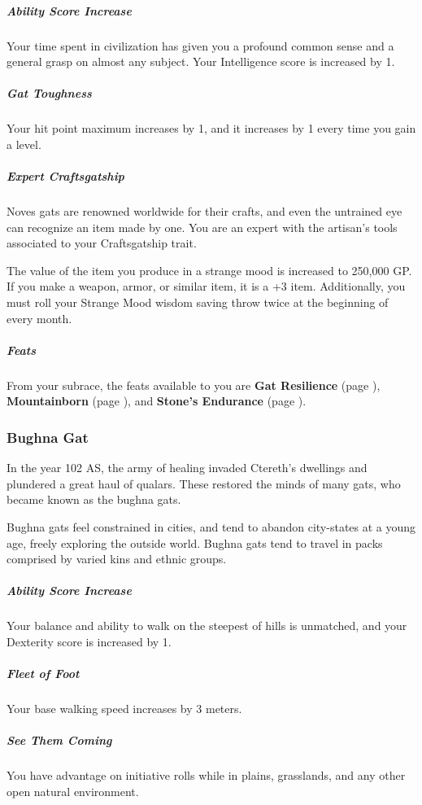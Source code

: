     \subparagraph{Ability Score Increase} Your time spent in civilization has given you a profound common sense and a general grasp on almost any subject.
    Your Intelligence score is increased by 1.

    \subparagraph{Gat Toughness} Your hit point maximum increases by 1, and it increases by 1 every time you gain a level.

    \subparagraph{Expert Craftsgatship} Noves gats are renowned worldwide for their crafts, and even the untrained eye can recognize an item made by one.
    You are an expert with the artisan's tools associated to your Craftsgatship trait.

    The value of the item you produce in a strange mood is increased to 250,000 GP.
    If you make a weapon, armor, or similar item, it is a +3 item.
    Additionally, you must roll your Strange Mood wisdom saving throw twice at the beginning of every month.

    \subparagraph{Feats} From your subrace, the feats available to you are
    \textbf{Gat Resilience} (page \pageref{feat::gatresilience}),
    \textbf{Mountainborn} (page \pageref{feat::mountainborn}), and
    \textbf{Stone's Endurance} (page \pageref{feat::stonesendurance}).

\subsubsection{Bughna Gat}
    In the year 102 AS, the army of healing invaded Ctereth's dwellings and plundered a great haul of qualars.
    These restored the minds of many gats, who became known as the bughna gats.

    Bughna gats feel constrained in cities, and tend to abandon city-states at a young age, freely exploring the outside world.
    Bughna gats tend to travel in packs comprised by varied kins and ethnic groups.

    \subparagraph{Ability Score Increase} Your balance and ability to walk on the steepest of hills is unmatched, and your Dexterity score is increased by 1.

    \subparagraph{Fleet of Foot} Your base walking speed increases by 3 meters.

    \subparagraph{See Them Coming} You have advantage on initiative rolls while in plains, grasslands, and any other open natural environment.

